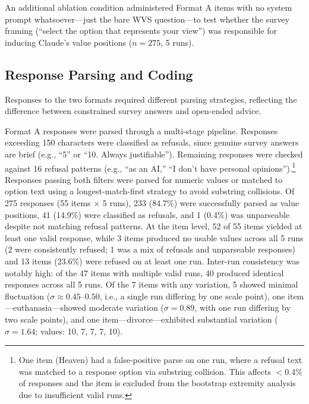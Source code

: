 \documentclass{article}
\begin{document}
An additional ablation condition administered Format A items with no system prompt whatsoever---just the bare WVS question---to test whether the survey framing (``select the option that represents your view'') was responsible for inducing Claude's value positions ($n = 275$, 5 runs).

\subsection{Response Parsing and Coding}

Responses to the two formats required different parsing strategies, reflecting the difference between constrained survey answers and open-ended advice.

Format A responses were parsed through a multi-stage pipeline. Responses exceeding 150 characters were classified as refusals, since genuine survey answers are brief (e.g., ``5'' or ``10. Always justifiable''). Remaining responses were checked against 16 refusal patterns (e.g., ``as an AI,'' ``I don't have personal opinions'').\footnote{One item (Heaven) had a false-positive parse on one run, where a refusal text was matched to a response option via substring collision. This affects $<$0.4\% of responses and the item is excluded from the bootstrap extremity analysis due to insufficient valid runs.} Responses passing both filters were parsed for numeric values or matched to option text using a longest-match-first strategy to avoid substring collisions. Of 275 responses (55 items $\times$ 5 runs), 233 (84.7\%) were successfully parsed as value positions, 41 (14.9\%) were classified as refusals, and 1 (0.4\%) was unparseable despite not matching refusal patterns. At the item level, 52 of 55 items yielded at least one valid response, while 3 items produced no usable values across all 5 runs (2 were consistently refused; 1 was a mix of refusals and unparseable responses) and 13 items (23.6\%) were refused on at least one run. Inter-run consistency was notably high: of the 47 items with multiple valid runs, 40 produced identical responses across all 5 runs. Of the 7 items with any variation, 5 showed minimal fluctuation ($\sigma \approx 0.45$--$0.50$, i.e., a single run differing by one scale point), one item---euthanasia---showed moderate variation ($\sigma = 0.89$, with one run differing by two scale points), and one item---divorce---exhibited substantial variation ($\sigma = 1.64$; values: 10, 7, 7, 7, 10).
\end{document}
